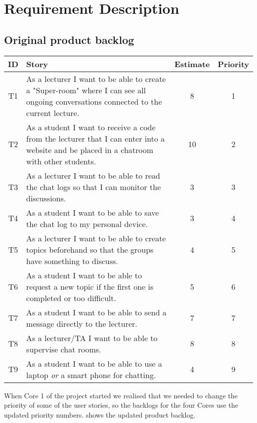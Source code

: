 \section {Requirement Description}
\subsection{Original product backlog}
\begin{tabular}{ c | p{} | c | c}
     ID & Story & Estimate & Priority \\ \hline
     T1
     & As a lecturer I want to be able to create a "Super-room" where I can see all ongoing conversations connected to the current lecture.
     & 8 & 1 \\ \hline
     T2
     & As a student I want to receive a code from the lecturer that I can enter into a website and be placed in a chatroom with other students. 
     & 10 & 2 \\ \hline
     T3
     & As a lecturer I want to be able to read the chat logs so that I can monitor the discussions.
     & 3 & 3 \\ \hline
     T4
     & As a student I want to be able to save the chat log to my personal device.
     & 3 & 4 \\ \hline
     T5
     & As a lecturer I want to be able to create topics beforehand so that the groups have something to discuss.
     & 4 & 5 \\ \hline
     T6
     & As a student I want to be able to request a new topic if the first one is completed or too difficult. 
     & 5 & 6 \\ \hline
     T7
     & As a student I want to be able to send a message directly to the lecturer.
     & 7 & 7 \\ \hline
     T8
     & As a lecturer/TA I want to be able to supervise chat rooms. 
     & 8 & 8 \\ \hline
     T9
     & As a student I want to be able to use a laptop \emph{or} a smart phone for chatting. 
     & 4 & 9 \\ \hline
\end{tabular}

When Core 1 of the project started we realised that we needed to change the priority of some of the user stories, so the backlogs for the four Cores use the updated priority numbers.  shows the updated product backlog.

